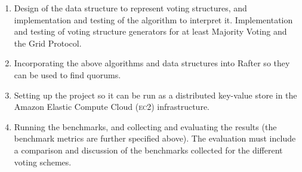 \documentclass[12pt,chapterprefix=true,toc=bibliography,numbers=noendperiod,
               footnotes=multiple,twoside]{scrreprt}
\begin{document}
\begin{enumerate}

\item Design of the data structure to represent voting structures, and implementation and testing of the algorithm to interpret it. Implementation and testing of voting structure generators for at least Majority Voting and the Grid Protocol.

\item Incorporating the above algorithms and data structures into Rafter so they can be used to find quorums.

\item Setting up the project so it can be run as a distributed key-value store in the Amazon Elastic Compute Cloud (\textsc{ec2}) infrastructure.

\item Running the benchmarks, and collecting and evaluating the results (the benchmark metrics are further specified above). The evaluation must include a comparison and discussion of the benchmarks collected for the different voting schemes.


\end{enumerate}
\end{document}
